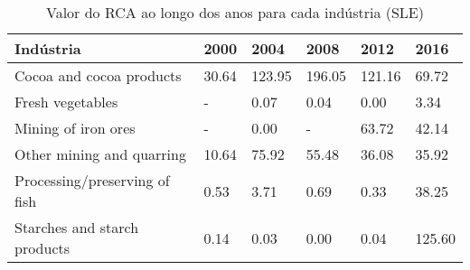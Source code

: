 \begin{table}
\centering
\caption{Valor do RCA ao longo dos anos para cada indústria (SLE)}
\begin{tabular}{p{6cm}p{1.5cm}p{1.5cm}p{1.5cm}p{1.5cm}p{1.5cm}}
\toprule
                    Indústria &  2000 &   2004 &   2008 &   2012 &   2016 \\
\midrule
     Cocoa and cocoa products & 30.64 & 123.95 & 196.05 & 121.16 &  69.72 \\
             Fresh vegetables &     - &   0.07 &   0.04 &   0.00 &   3.34 \\
          Mining of iron ores &     - &   0.00 &      - &  63.72 &  42.14 \\
    Other mining and quarring & 10.64 &  75.92 &  55.48 &  36.08 &  35.92 \\
Processing/preserving of fish &  0.53 &   3.71 &   0.69 &   0.33 &  38.25 \\
 Starches and starch products &  0.14 &   0.03 &   0.00 &   0.04 & 125.60 \\
\bottomrule
\end{tabular}
\end{table}
